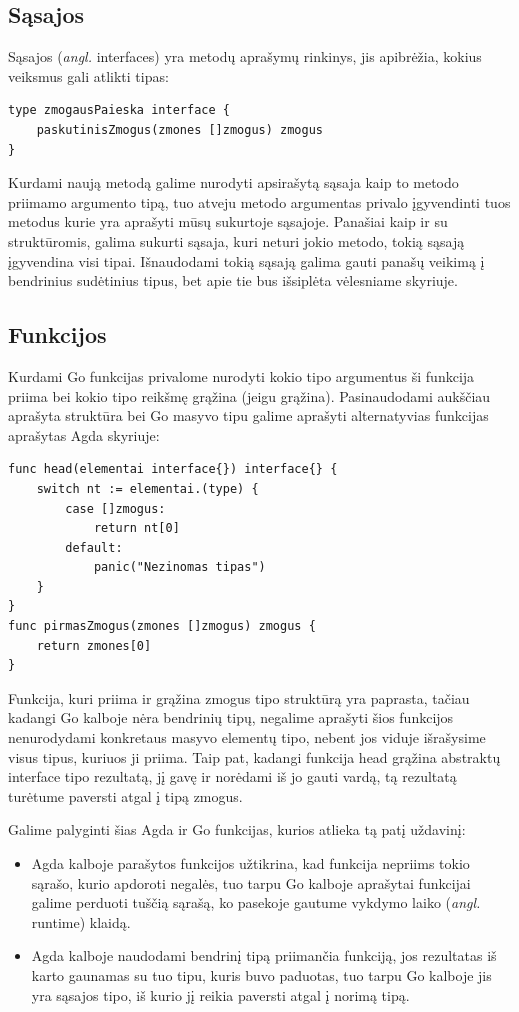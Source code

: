 \documentclass{VUMIFPSbakalaurinis}
\begin{document}
\subsection{Sąsajos}
Sąsajos (\textit{angl.} interfaces) yra metodų aprašymų rinkinys, jis apibrėžia, kokius veiksmus gali atlikti tipas:
\begin{lstlisting}[language=GoCust]
type zmogausPaieska interface {
	paskutinisZmogus(zmones []zmogus) zmogus
}
\end{lstlisting}
Kurdami naują metodą galime nurodyti apsirašytą sąsaja kaip to metodo priimamo argumento tipą, tuo atveju metodo argumentas privalo įgyvendinti tuos metodus kurie yra aprašyti mūsų sukurtoje sąsajoje. Panašiai kaip ir su struktūromis, galima sukurti sąsaja, kuri neturi jokio metodo, tokią sąsają įgyvendina visi tipai. Išnaudodami tokią sąsają galima gauti panašų veikimą į bendrinius sudėtinius tipus, bet apie tie bus išsiplėta vėlesniame skyriuje.
\subsection{Funkcijos}
Kurdami Go funkcijas privalome nurodyti kokio tipo argumentus ši funkcija priima bei kokio tipo reikšmę grąžina (jeigu grąžina). Pasinaudodami aukščiau aprašyta struktūra bei Go masyvo tipu galime aprašyti alternatyvias funkcijas aprašytas Agda skyriuje:
\begin{lstlisting}[language=GoCust]
func head(elementai interface{}) interface{} {
	switch nt := elementai.(type) {
		case []zmogus:
			return nt[0]
		default:
			panic("Nezinomas tipas")
	}
}
func pirmasZmogus(zmones []zmogus) zmogus {
	return zmones[0]
}
\end{lstlisting}
Funkcija, kuri priima ir grąžina zmogus tipo struktūrą yra paprasta, tačiau kadangi Go kalboje nėra bendrinių tipų, negalime aprašyti šios funkcijos nenurodydami konkretaus masyvo elementų tipo, nebent jos viduje išrašysime visus tipus, kuriuos ji priima. Taip pat, kadangi funkcija head grąžina abstraktų interface{} tipo rezultatą, jį gavę ir norėdami iš jo gauti vardą, tą rezultatą turėtume paversti atgal į tipą zmogus. \par Galime palyginti šias Agda ir Go funkcijas, kurios atlieka tą patį uždavinį:
\begin{itemize}
	\item Agda kalboje parašytos funkcijos užtikrina, kad funkcija nepriims tokio sąrašo, kurio apdoroti negalės, tuo tarpu Go kalboje aprašytai funkcijai galime perduoti tuščią sąrašą, ko pasekoje gautume vykdymo laiko (\textit{angl.} runtime) klaidą.
	\item Agda kalboje naudodami bendrinį tipą priimančia funkciją, jos rezultatas iš karto gaunamas su tuo tipu, kuris buvo paduotas, tuo tarpu Go kalboje jis yra sąsajos tipo, iš kurio jį reikia paversti atgal į norimą tipą.
\end{itemize}
\end{document}
